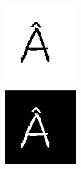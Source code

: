 \begin{minipage}{0.5\linewidth}
	\centering
	\includegraphics[width=0.9\linewidth]{./Experiments/LOGNOT/fig/Input.png} 
	\label{fig:input-LN}
\end{minipage}
\begin{minipage}{0.5\linewidth}
	\centering
	\includegraphics[width=0.9\linewidth]{./Experiments/LOGNOT/fig/Output.png}
	\label{fig:output-LN}
\end{minipage}
